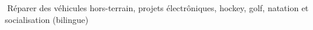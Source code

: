 \documentclass[mm]{res}
\begin{document}
\begin{resume}
\section{\headinginterests}
􏰚\tb R\'eparer des v\'ehicules hors-terrain, projets \'electr\^oniques, hockey, golf, natation et socialisation (bilingue)

\end{resume}
\end{document}
